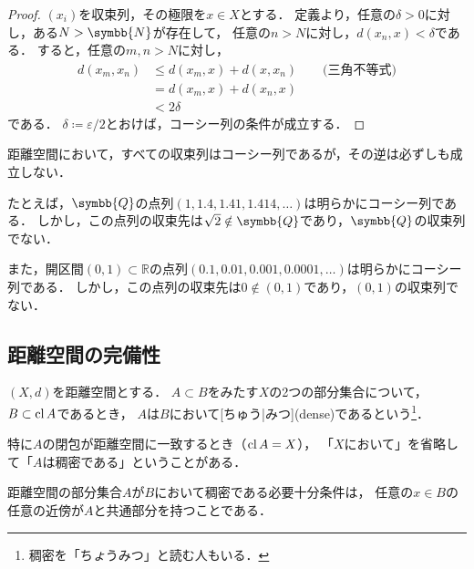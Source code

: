 \documentclass[../sotsu.tex]{subfiles}
\begin{document}
\begin{proof}
    $(x_i)$を収束列，その極限を$x \in X$とする．
    定義より，任意の$\delta > 0$に対し，ある$N > \symbb{N}$が存在して，
    任意の$n > N$に対し，$d(x_n, x) < \delta$である．
    すると，任意の$m, n > N$に対し，
    \begin{equation*}
        \begin{split}
            d(x_m, x_n) &\leq d(x_m, x) + d(x, x_n)  \qquad \text{(三角不等式)}  \\
                &= d(x_m, x) + d(x_n, x)  \\
                &< 2\delta
        \end{split}
    \end{equation*}
    である．
    $\delta \coloneq \varepsilon/2$とおけば，コーシー列の条件が成立する．
\end{proof}

距離空間において，すべての収束列はコーシー列であるが，その逆は必ずしも成立しない．

たとえば，$\symbb{Q}$の点列$(1, 1.4, 1.41, 1.414, \dotsc)$は明らかにコーシー列である．
しかし，この点列の収束先は$\sqrt{2} \notin \symbb{Q}$であり，$\symbb{Q}$の収束列でない．

また，開区間$(0, 1) \subset ℝ$の点列$(0.1, 0.01, 0.001, 0.0001, \dotsc)$は明らかにコーシー列である．
しかし，この点列の収束先は$0 \notin (0, 1)$であり，$(0, 1)$の収束列でない．


\subsection{距離空間の完備性}
\label{sec:complete-metric-space}


\begin{definition}[稠密]
    \label{dfn:dense}
    $(X, d)$を距離空間とする．
    $A \subset B$をみたす$X$の2つの部分集合について，
    $B \subset \operatorname{cl}{A}$であるとき，
    $A$は$B$において[ちゅう|みつ](dense)であるという\footnote{
        稠密を「ち\emph{ょ}うみつ」と読む人もいる．
    }\cite{iwanami-functional}．

    特に$A$の閉包が距離空間に一致するとき（$\operatorname{cl}{A} = X$），
    「$X$において」を省略して「$A$は稠密である」ということがある．
\end{definition}


\begin{proposition}
    距離空間の部分集合$A$が$B$において稠密である必要十分条件は，
    任意の$x \in B$の任意の近傍が$A$と共通部分を持つことである\cite{iwanami-functional}．
\end{proposition}
\end{document}
